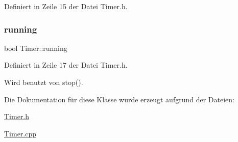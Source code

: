 Definiert in Zeile 15 der Datei Timer.\+h.

\mbox{\label{class_timer_a3b8bb57a0a252c88f85c0592715ea425}} 
\subsubsection{\texorpdfstring{running}{running}}
{\footnotesize\ttfamily bool Timer\+::running\hspace{0.3cm}{\ttfamily [private]}}



Definiert in Zeile 17 der Datei Timer.\+h.



Wird benutzt von stop().



Die Dokumentation für diese Klasse wurde erzeugt aufgrund der Dateien\+:\begin{DoxyCompactItemize}
\item 
\hyperlink{_timer_8h}{Timer.\+h}\item 
\hyperlink{_timer_8cpp}{Timer.\+cpp}\end{DoxyCompactItemize}
